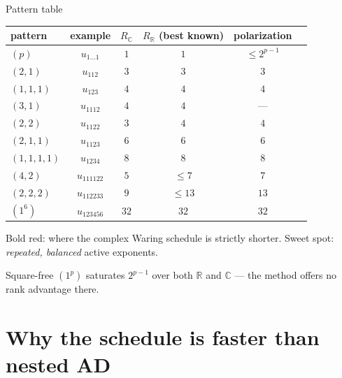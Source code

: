 \documentclass[10pt,aspectratio=169]{beamer}
\newcommand{\R}{\mathbb{R}}
\newcommand{\C}{\mathbb{C}}
\begin{document}
\begin{frame}{Pattern table}
  \begin{table}\centering
  \begin{tabular}{lccccc}
    \toprule
    pattern & example & $R_\C$ & $R_\R$ (best known) & polarization \\
    \midrule
    $(p)$         & $u_{1\dots1}$  & $1$  & $1$  & $\le 2^{p-1}$ \\
    $(2,1)$       & $u_{112}$      & $3$  & $3$  & $3$ \\
    $(1,1,1)$     & $u_{123}$      & $4$  & $4$  & $4$ \\
    $(3,1)$       & $u_{1112}$     & $4$  & $4$  & --- \\
    $(2,2)$       & $u_{1122}$     & \alert{$3$} & $4$ & $4$ \\
    $(2,1,1)$     & $u_{1123}$     & $6$  & $6$  & $6$ \\
    $(1,1,1,1)$   & $u_{1234}$     & $8$  & $8$  & $8$ \\
    $(4,2)$       & $u_{111122}$   & \alert{$5$} & $\le 7$ & $7$ \\
    $(2,2,2)$     & $u_{112233}$   & \alert{$9$} & $\le 13$ & $13$ \\
    $(1^6)$       & $u_{123456}$   & $32$ & $32$ & $32$ \\
    \bottomrule
  \end{tabular}\end{table}
  \alert{Bold red:} where the complex Waring schedule is strictly shorter.
  Sweet spot: \emph{repeated, balanced} active exponents.

  \medskip
  Square-free $(1^p)$ saturates $2^{p-1}$ over both $\R$ and $\C$ ---
  the method offers no rank advantage there.
\end{frame}

\section{Why the schedule is faster than nested AD}
\end{document}
